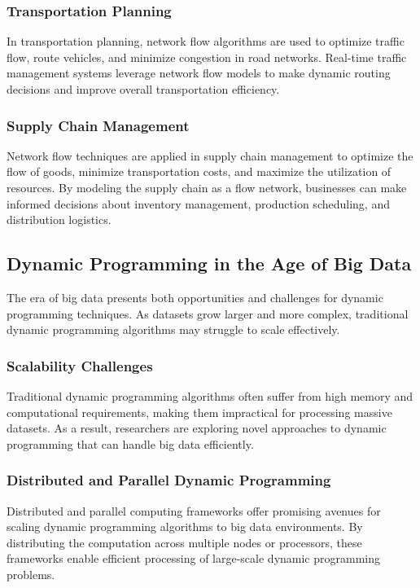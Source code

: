 \documentclass[12pt]{book} %
\begin{document}
\subsubsection{Transportation Planning}
In transportation planning, network flow algorithms are used to optimize traffic flow, route vehicles, and minimize congestion in road networks. Real-time traffic management systems leverage network flow models to make dynamic routing decisions and improve overall transportation efficiency.

\subsubsection{Supply Chain Management}
Network flow techniques are applied in supply chain management to optimize the flow of goods, minimize transportation costs, and maximize the utilization of resources. By modeling the supply chain as a flow network, businesses can make informed decisions about inventory management, production scheduling, and distribution logistics.

\subsection{Dynamic Programming in the Age of Big Data}
The era of big data presents both opportunities and challenges for dynamic programming techniques. As datasets grow larger and more complex, traditional dynamic programming algorithms may struggle to scale effectively.

\subsubsection{Scalability Challenges}
Traditional dynamic programming algorithms often suffer from high memory and computational requirements, making them impractical for processing massive datasets. As a result, researchers are exploring novel approaches to dynamic programming that can handle big data efficiently.

\subsubsection{Distributed and Parallel Dynamic Programming}
Distributed and parallel computing frameworks offer promising avenues for scaling dynamic programming algorithms to big data environments. By distributing the computation across multiple nodes or processors, these frameworks enable efficient processing of large-scale dynamic programming problems.
\end{document}
